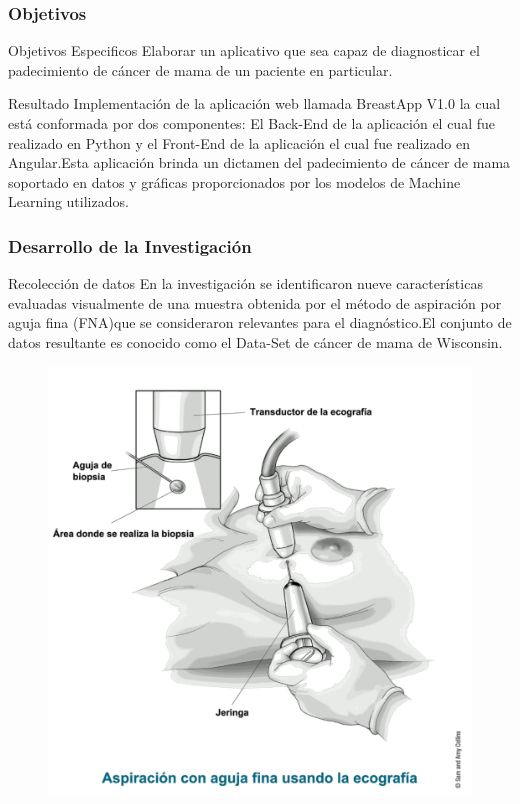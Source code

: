 \documentclass[xcolor=dvipsnames,xcolor=table]{beamer} %
\begin{document}
\begin{frame}
	\frametitle{Objetivos}
	\begin{block}{Objetivos Especificos}\justifying
	Elaborar un aplicativo que sea capaz de diagnosticar el padecimiento de cáncer de mama de un paciente en particular. 
	\end{block}
	
	\begin{alertblock}{Resultado}
		\justifying	
		Implementación de la aplicación web llamada BreastApp V1.0 la cual está conformada por dos componentes: El Back-End de la aplicación el cual fue realizado en Python y el Front-End de la aplicación el cual fue realizado en Angular.Esta aplicación brinda  un dictamen del padecimiento de cáncer de mama soportado en datos y gráficas proporcionados por los modelos de Machine Learning utilizados.
	\end{alertblock}
\end{frame}
\begin{frame}
	\frametitle{Desarrollo de la Investigación}
	
	\justifying
	\begin{block}{Recolección de datos}\justifying
		En la investigación se identificaron nueve características evaluadas visualmente de una muestra obtenida por el método de aspiración por aguja fina (FNA)que se consideraron relevantes para el diagnóstico.El conjunto de datos resultante es conocido como el Data-Set de cáncer de mama de Wisconsin\cite{b2}.
	\end{block}
	\begin{figure}[h!]
		\centering
		\includegraphics[width=0.4\linewidth]{PROYECTO/imgs/fnaTest}
	\end{figure}
\end{frame}
\end{document}

